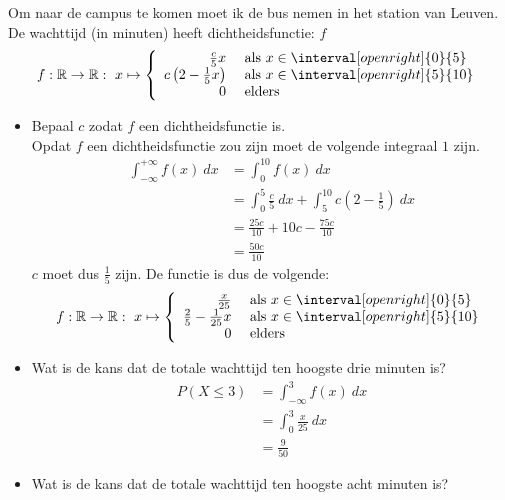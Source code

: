 \documentclass[main.tex]{subfiles}
\begin{document}
\begin{oef}
  Om naar de campus te komen moet ik de bus nemen in het station van Leuven. De wachttijd (in minuten) heeft dichtheidsfunctie: $f$
  \[
  f: \mathbb{R} \rightarrow \mathbb{R}:\ x \mapsto
  \left\{
    \begin{array}{rl}
      \frac{c}{5}x & \text{ als } x\in \interval[open right]{0}{5}\\
      c \left(2-\frac{1}{5}x\right) & \text{ als } x\in \interval[open right]{5}{10}\\
      0 & \text{ elders }
    \end{array}
  \right.
  \]

  \begin{itemize}
  \item Bepaal $c$ zodat $f$ een dichtheidsfunctie is.\\
    Opdat $f$ een dichtheidsfunctie zou zijn moet de volgende integraal $1$ zijn.
    \[
    \begin{array}{rl}
      \int_{-\infty}^{+\infty}f(x)\ dx 
      &= \int_{0}^{10}f(x)\ dx \\
      &= \int_{0}^{5}\frac{c}{5}\ dx + \int_{5}^{10}c\left(2-\frac{1}{5}\right)\ dx\\
      &= \frac{25c}{10} + 10c - \frac{75c}{10}\\
      &= \frac{50c}{10}
    \end{array}
    \]
    $c$ moet dus $\frac{1}{5}$ zijn.
    De functie is dus de volgende:
    \[
    f: \mathbb{R} \rightarrow \mathbb{R}:\ x \mapsto
    \left\{
      \begin{array}{rl}
        \frac{x}{25} & \text{ als } x\in \interval[open right]{0}{5}\\
        \frac{2}{5}-\frac{1}{25}x & \text{ als } x\in \interval[open right]{5}{10}\\
        0 & \text{ elders }
      \end{array}
    \right.
    \]
  \item Wat is de kans dat de totale wachttijd ten hoogste drie minuten is?
    \[
    \begin{array}{rl}
      P(X \le 3)
      &= \int_{-\infty}^{3}f(x)\ dx\\
      &= \int_{0}^{3}\frac{x}{25}\ dx\\
      &= \frac{9}{50}
    \end{array}
    \]
  \item Wat is de kans dat de totale wachttijd ten hoogste acht minuten is?
    \[
    \begin{array}{rl}

\end{array}\]
\end{itemize}
\end{oef}
\end{document}
